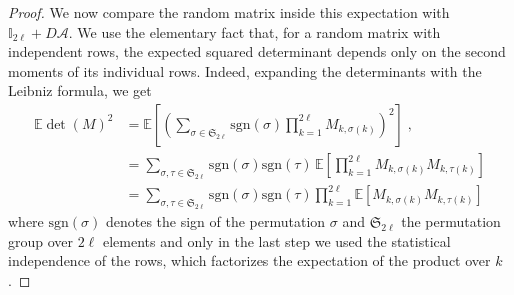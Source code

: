\documentclass[prx,twocolumn,superscriptaddress,aps,10pt, frontmatterverbose, reprint,footinbib,longbibliography=true]{revtex4-2}
\begin{document}
\begin{proof}
We now compare the random matrix inside this expectation with
$\mathbb{I}_{2\ell}+D\mathcal{A}$. We use the elementary fact that, for
a random matrix with independent rows, the expected squared
determinant depends only on the second moments of its individual
rows. Indeed, expanding the determinants with the Leibniz formula, we get
\begin{equation}
\begin{split}
    \mathbb{E}\det(M)^2
&=
\mathbb{E}\!\left[\left(\sum_{\sigma\in\mathfrak{S}_{2\ell}}
\mathrm{sgn}(\sigma)
\prod_{k=1}^{2\ell}
M_{k,\sigma(k)}
\right)^2\right]\;,\\
&=\sum_{\sigma,\tau\in \mathfrak{S}_{2\ell}} \mathrm{sgn}(\sigma) \mathrm{sgn}(\tau)\,
\mathbb{E}\!\left[\prod_{k=1}^{2\ell}M_{k,\sigma(k)}M_{k,\tau(k)}\right]\\
&=\sum_{\sigma,\tau\in \mathfrak{S}_{2\ell}} \mathrm{sgn}(\sigma) \mathrm{sgn}(\tau)
\prod_{k=1}^{2\ell}
\mathbb{E}\!\left[M_{k,\sigma(k)}M_{k,\tau(k)}\right]
\end{split}
\end{equation}
where $\mathrm{sgn}(\sigma)$ denotes the sign of the permutation $\sigma$ and $\mathfrak{S}_{2\ell}$ the permutation group over $2\ell$ elements and only in the last step we used the statistical independence of the rows, which factorizes the expectation of the product over $k$.


\end{proof}
\end{document}
